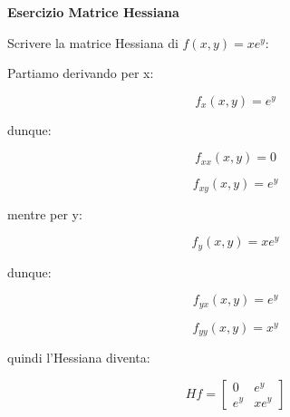 \documentclass[../appunti-analisi.tex]{subfiles}
\begin{document}
\textbf{Esercizio Matrice Hessiana} 

Scrivere la matrice Hessiana di $f(x,y)= xe ^{y}$:

Partiamo derivando per x:

\[
   f_x(x,y) = e ^{y} 
\]

dunque:

\[
    f_{xx}(x,y) = 0
\]

\[
    f_{xy}(x,y) = e ^{y}
\]

mentre per y:

\[
    f_y(x,y) = x e ^{y}
\]

dunque:

\[
    f_{yx}(x,y) = e ^{y}
\]

\[
    f_{yy}(x,y) = x ^{y}
\]

quindi l'Hessiana diventa:

\[
    Hf = \begin{bmatrix}
    0 & e ^{y} \\
    e ^{y} & x e^{y}  
    \end{bmatrix}
\]
\end{document}
